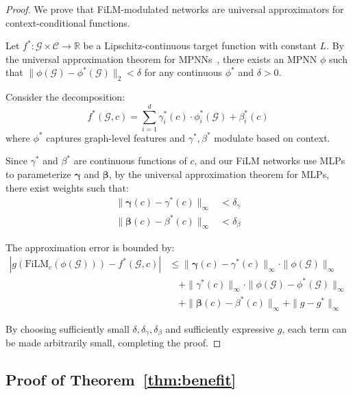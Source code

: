 \documentclass[sigconf]{acmart}
\begin{document}
\begin{proof}
We prove that FiLM-modulated networks are universal approximators for context-conditional functions.

Let $f^*: \mathcal{G} \times \mathcal{C} \rightarrow \mathbb{R}$ be a Lipschitz-continuous target function with constant $L$. By the universal approximation theorem for MPNNs~\cite{xu_2019_gnn_power}, there exists an MPNN $\phi$ such that $\|\phi(\mathcal{G}) - \phi^*(\mathcal{G})\|_2 < \delta$ for any continuous $\phi^*$ and $\delta > 0$.

Consider the decomposition:
\begin{equation}
    f^*(\mathcal{G}, c) = \sum_{i=1}^{d} \gamma_i^*(c) \cdot \phi_i^*(\mathcal{G}) + \beta_i^*(c)
\end{equation}
where $\phi^*$ captures graph-level features and $\gamma^*, \beta^*$ modulate based on context.

Since $\gamma^*$ and $\beta^*$ are continuous functions of $c$, and our FiLM networks use MLPs to parameterize $\boldsymbol{\gamma}$ and $\boldsymbol{\beta}$, by the universal approximation theorem for MLPs, there exist weights such that:
\begin{align}
    \|\boldsymbol{\gamma}(c) - \gamma^*(c)\|_\infty &< \delta_\gamma \\
    \|\boldsymbol{\beta}(c) - \beta^*(c)\|_\infty &< \delta_\beta
\end{align}

The approximation error is bounded by:
\begin{align}
    |g(\text{FiLM}_c(\phi(\mathcal{G}))) - f^*(\mathcal{G}, c)| &\leq \|\boldsymbol{\gamma}(c) - \gamma^*(c)\|_\infty \cdot \|\phi(\mathcal{G})\|_\infty \\
    &\quad + \|\gamma^*(c)\|_\infty \cdot \|\phi(\mathcal{G}) - \phi^*(\mathcal{G})\|_\infty \\
    &\quad + \|\boldsymbol{\beta}(c) - \beta^*(c)\|_\infty + \|g - g^*\|_\infty
\end{align}

By choosing sufficiently small $\delta, \delta_\gamma, \delta_\beta$ and sufficiently expressive $g$, each term can be made arbitrarily small, completing the proof.
\end{proof}

\subsection{Proof of Theorem~\ref{thm:benefit}}
\end{document}
